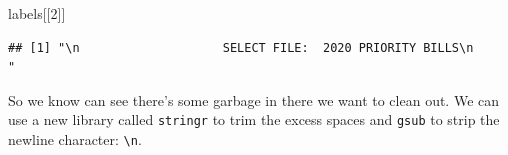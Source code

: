 \documentclass[]{book}
\newenvironment{Shaded}{\begin{snugshade}}{\end{snugshade}}
\newcommand{\CharTok}[1]{\textcolor[rgb]{0.31,0.60,0.02}{#1}}
\newcommand{\DataTypeTok}[1]{\textcolor[rgb]{0.13,0.29,0.53}{#1}}
\newcommand{\DecValTok}[1]{\textcolor[rgb]{0.00,0.00,0.81}{#1}}
\newcommand{\KeywordTok}[1]{\textcolor[rgb]{0.13,0.29,0.53}{\textbf{#1}}}
\newcommand{\NormalTok}[1]{#1}
\newcommand{\OperatorTok}[1]{\textcolor[rgb]{0.81,0.36,0.00}{\textbf{#1}}}
\newcommand{\StringTok}[1]{\textcolor[rgb]{0.31,0.60,0.02}{#1}}
\begin{document}
\begin{Shaded}
\begin{Highlighting}[]
\NormalTok{labels[[}\DecValTok{2}\NormalTok{]]}
\end{Highlighting}
\end{Shaded}

\begin{verbatim}
## [1] "\n                    SELECT FILE:  2020 PRIORITY BILLS\n                "
\end{verbatim}

So we know can see there's some garbage in there we want to clean out. We can use a new library called \texttt{stringr} to trim the excess spaces and \texttt{gsub} to strip the newline character: \texttt{\textbackslash{}n}.

\begin{Shaded}
\end{Shaded}
\end{document}

